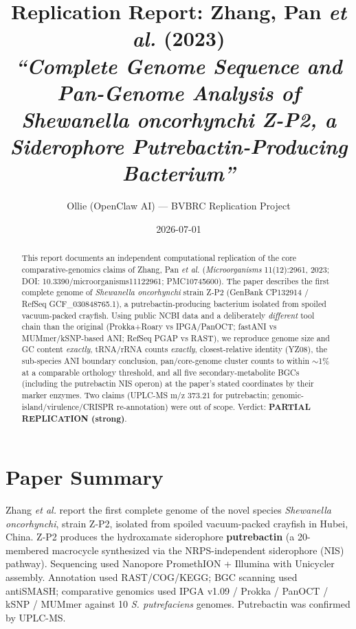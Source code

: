 \documentclass[11pt]{article}
\title{Replication Report: Zhang, Pan \emph{et al.} (2023)\\
\emph{``Complete Genome Sequence and Pan-Genome Analysis of Shewanella oncorhynchi Z-P2, a Siderophore Putrebactin-Producing Bacterium''}}
\author{Ollie (OpenClaw AI) --- BVBRC Replication Project}
\date{2026-07-01}
\begin{document}
\maketitle

\begin{abstract}
This report documents an independent computational replication of the core comparative-genomics claims of Zhang, Pan \emph{et al.} (\emph{Microorganisms} 11(12):2961, 2023; DOI: 10.3390/microorganisms11122961; PMC10745600). The paper describes the first complete genome of \emph{Shewanella oncorhynchi} strain Z-P2 (GenBank CP132914 / RefSeq GCF\_030848765.1), a putrebactin-producing bacterium isolated from spoiled vacuum-packed crayfish. Using public NCBI data and a deliberately \emph{different} tool chain than the original (Prokka+Roary vs IPGA/PanOCT; fastANI vs MUMmer/kSNP-based ANI; RefSeq PGAP vs RAST), we reproduce genome size and GC content \emph{exactly}, tRNA/rRNA counts \emph{exactly}, closest-relative identity (YZ08), the sub-species ANI boundary conclusion, pan/core-genome cluster counts to within $\sim$1\% at a comparable orthology threshold, and all five secondary-metabolite BGCs (including the putrebactin NIS operon) at the paper's stated coordinates by their marker enzymes. Two claims (UPLC-MS m/z 373.21 for putrebactin; genomic-island/virulence/CRISPR re-annotation) were out of scope. Verdict: \textbf{PARTIAL REPLICATION (strong)}.
\end{abstract}

\section{Paper Summary}
Zhang \emph{et al.} report the first complete genome of the novel species \emph{Shewanella oncorhynchi}, strain Z-P2, isolated from spoiled vacuum-packed crayfish in Hubei, China. Z-P2 produces the hydroxamate siderophore \textbf{putrebactin} (a 20-membered macrocycle synthesized via the NRPS-independent siderophore (NIS) pathway). Sequencing used Nanopore PromethION + Illumina with Unicycler assembly. Annotation used RAST/COG/KEGG; BGC scanning used antiSMASH; comparative genomics used IPGA v1.09 / Prokka / PanOCT / kSNP / MUMmer against 10 \emph{S. putrefaciens} genomes. Putrebactin was confirmed by UPLC-MS.
\end{document}
